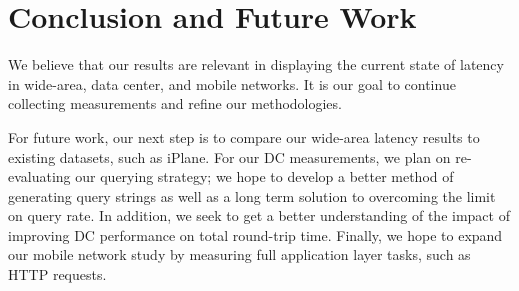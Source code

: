 
\section{Conclusion and Future Work}
\label{sec:conclusion}

We believe that our results are relevant in displaying the current state of latency in wide-area, data center, and mobile networks. It is our goal to continue collecting measurements and refine our methodologies. 

For future work, our next step is to compare our wide-area latency results to existing datasets, such as iPlane. For our DC measurements, we plan on re-evaluating our querying strategy; we hope to develop a better method of generating query strings as well as a long term solution to overcoming the limit on query rate. In addition, we seek to get a better understanding of the impact of improving DC performance on total round-trip time. Finally, we hope to expand our mobile network study by measuring full application layer tasks, such as HTTP requests.

